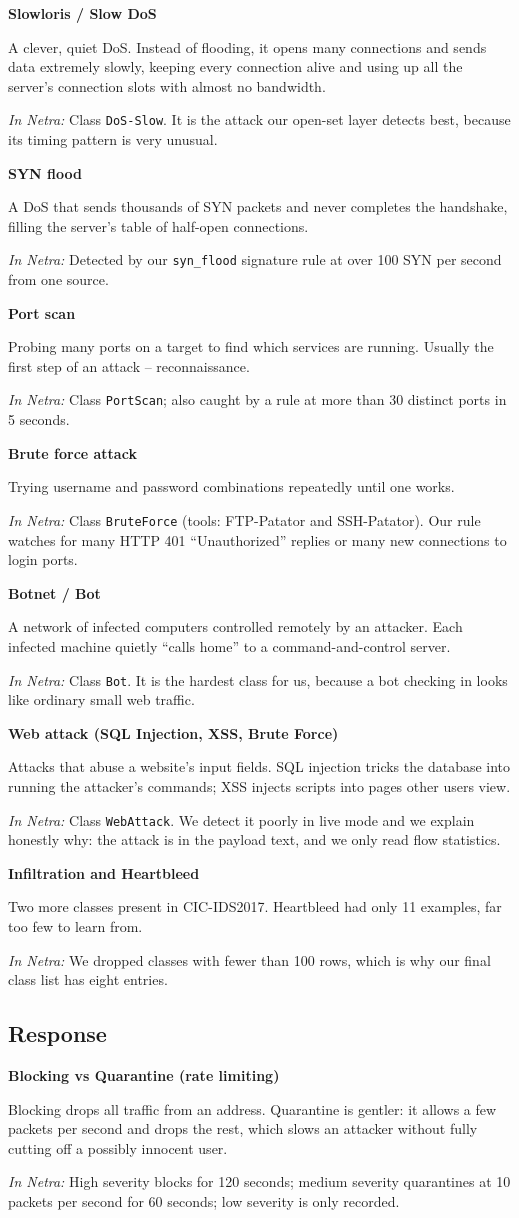 \documentclass[11pt,a4paper]{article}
\newcommand{\term}[3]{%
  \par\medskip\noindent\textbf{\color{ink}#1}\par
  \nobreak\vspace{1pt}#2\par
  \nobreak\vspace{1pt}\textit{\color{accent}In Netra:} #3\par}
\begin{document}
\term{Slowloris / Slow DoS}
{A clever, quiet DoS. Instead of flooding, it opens many connections and sends
data extremely slowly, keeping every connection alive and using up all the
server's connection slots with almost no bandwidth.}
{Class \texttt{DoS-Slow}. It is the attack our open-set layer detects best,
because its timing pattern is very unusual.}

\term{SYN flood}
{A DoS that sends thousands of SYN packets and never completes the handshake,
filling the server's table of half-open connections.}
{Detected by our \texttt{syn\_flood} signature rule at over 100 SYN per second
from one source.}

\term{Port scan}
{Probing many ports on a target to find which services are running. Usually the
first step of an attack -- reconnaissance.}
{Class \texttt{PortScan}; also caught by a rule at more than 30 distinct ports in
5 seconds.}

\term{Brute force attack}
{Trying username and password combinations repeatedly until one works.}
{Class \texttt{BruteForce} (tools: FTP-Patator and SSH-Patator). Our rule watches
for many HTTP 401 ``Unauthorized'' replies or many new connections to login ports.}

\term{Botnet / Bot}
{A network of infected computers controlled remotely by an attacker. Each infected
machine quietly ``calls home'' to a command-and-control server.}
{Class \texttt{Bot}. It is the hardest class for us, because a bot checking in
looks like ordinary small web traffic.}

\term{Web attack (SQL Injection, XSS, Brute Force)}
{Attacks that abuse a website's input fields. SQL injection tricks the database
into running the attacker's commands; XSS injects scripts into pages other users
view.}
{Class \texttt{WebAttack}. We detect it poorly in live mode and we explain
honestly why: the attack is in the payload text, and we only read flow statistics.}

\term{Infiltration and Heartbleed}
{Two more classes present in CIC-IDS2017. Heartbleed had only 11 examples, far too
few to learn from.}
{We dropped classes with fewer than 100 rows, which is why our final class list has
eight entries.}

\subsection{Response}

\term{Blocking vs Quarantine (rate limiting)}
{Blocking drops all traffic from an address. Quarantine is gentler: it allows a
few packets per second and drops the rest, which slows an attacker without fully
cutting off a possibly innocent user.}
{High severity blocks for 120 seconds; medium severity quarantines at 10 packets
per second for 60 seconds; low severity is only recorded.}
\end{document}
